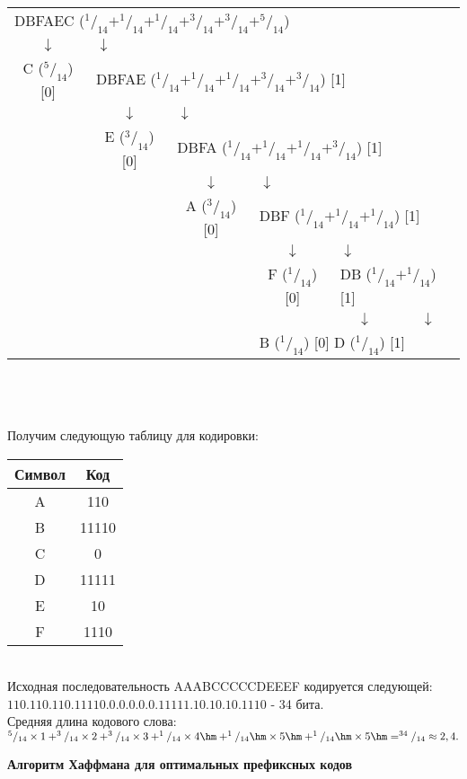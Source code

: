 \begin{table}[h]
\centering
\begin{tabular}{c c c c c c}
\multicolumn{6}{l}{DBFAEC ($^1/_{14} + ^1/_{14} + ^1/_{14} + ^3/_{14} + ^3/_{14} + ^5/_{14}$)} \\
$\downarrow$ & \multicolumn{5}{l}{$\downarrow$} \\
C ($^5/_{14}$) [0] & \multicolumn{5}{l}{DBFAE ($^1/_{14} + ^1/_{14} + ^1/_{14} + ^3/_{14} + ^3/_{14}$) [1]} \\
& $\downarrow$ & \multicolumn{4}{l}{$\downarrow$} \\
& E ($^3/_{14}$) [0] & \multicolumn{4}{l}{DBFA ($^1/_{14} + ^1/_{14} + ^1/_{14} + ^3/_{14}$) [1]} \\
& & $\downarrow$ & \multicolumn{3}{l}{$\downarrow$} \\
& & A ($^3/_{14}$) [0] & \multicolumn{3}{l}{DBF ($^1/_{14} + ^1/_{14} + ^1/_{14}$) [1]} \\
& & & $\downarrow$ & \multicolumn{2}{l}{$\downarrow$} \\
& & & F ($^1/_{14}$) [0] & \multicolumn{2}{l}{DB ($^1/_{14} + ^1/_{14}$) [1]} \\
& & & & $\downarrow$ & \multicolumn{1}{c}{$\downarrow$} \\
& & & \multicolumn{3}{l}{\qquad B ($^1/_{14}$) [0] \qquad D ($^1/_{14}$) [1]}\\
\end{tabular}
\end{table}
\\
\\
\\Получим следующую таблицу для кодировки:
\\
\begin{table}[h]
\begin{tabular}{|c|c|}
\hline
Символ &  Код \\
\hline
A & 110 \\
B & 11110 \\
C & 0 \\
D & 11111 \\
E & 10 \\
F & 1110 \\
\hline
\end{tabular}
\end{table}
\\Исходная последовательность AAABCCCCCDEEEF кодируется следующей: $110.110.110.11110.0.0.0.0.0.11111.10.10.10.1110$ - 34 бита.
\\Средняя длина кодового слова: $^5/_{14}\times 1 + ^3/_{14}\times 2 + ^3/_{14}\times 3 + ^1/_{14}\times 4\hm + ^1/_{14}\hm\times 5\hm + ^1/_{14}\hm\times 5\hm = ^{34}/_{14} \approx 2,4.$
\begin{center}
  \textbf{Алгоритм Хаффмана для оптимальных префиксных кодов}
\end{center}

